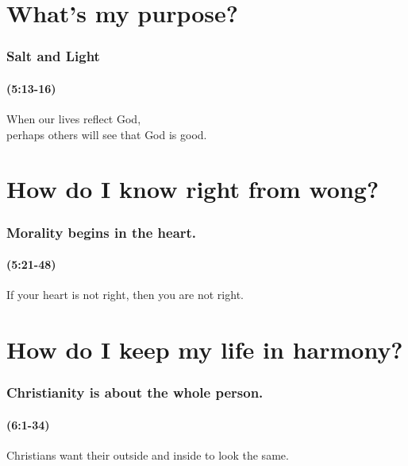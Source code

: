 \section{What's my purpose?}

\begin{frame}
\frametitle{Salt and Light}
\framesubtitle{(5:13-16)}
When our lives reflect God,\\perhaps others will see that God is good.
\end{frame}

\section{How do I know right from wong?}
\begin{frame}
\frametitle{Morality begins in the heart.}
\framesubtitle{(5:21-48)}
If your heart is not right, then you are not right. 

\end{frame}

\section{How do I keep my life in harmony?}
\begin{frame}
\frametitle{Christianity is about the whole person.}
\framesubtitle{(6:1-34)}
Christians want their outside and inside to look the same.
\end{frame}
